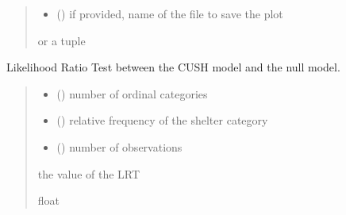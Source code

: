 \documentclass[letterpaper,10pt,english]{sphinxmanual}
\begin{document}
\begin{fulllineitems}
\begin{fulllineitems}
\begin{quote}
\begin{description}
\begin{itemize}
\item {} 
\sphinxAtStartPar
{} () \textendash{} if provided, name of the file to save the plot

\end{itemize}

\sphinxAtStartPar
{} or a tuple 

\end{description}\end{quote}

\end{fulllineitems}


\end{fulllineitems}


\begin{fulllineitems}
\label{\detokenize{cubmods:cubmods.cush.LRT}}
\pysigstartsignatures
{}
\pysigstopsignatures
\sphinxAtStartPar
Likelihood Ratio Test between the CUSH model and
the null model.
\begin{quote}\begin{description}
\begin{itemize}
\item {} 
\sphinxAtStartPar
{} () \textendash{} number of ordinal categories

\item {} 
\sphinxAtStartPar
{} () \textendash{} relative frequency of the shelter category

\item {} 
\sphinxAtStartPar
{} () \textendash{} number of observations

\end{itemize}

\sphinxAtStartPar
the value of the LRT

\sphinxAtStartPar
float

\end{description}\end{quote}

\end{fulllineitems}
\end{document}
